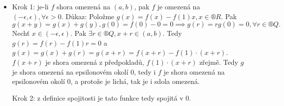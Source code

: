 \documentclass[12pt]{article}					%
\begin{document}
\begin{veta}
\begin{dukazin}
\begin{itemize}
                \item Krok 1: je-li $f$ shora omezená na $(a, b)$, pak $f$ je omezená na $(-\epsilon, \epsilon), \forall \epsilon > 0$. Důkaz: Položme $g(x) = f(x) - f(1)x, x \in ®R$. Pak
                    $$ g(x+y) = g(x)+g(y), g(0) = f(0) - 0 = 0 \implies g(r) = rg(0) = 0, \forall r \in ®Q. $$
                    Nechť $x \in (-\epsilon, \epsilon)$. Pak $\exists r \in ®Q, x+r \in (a, b)$. Tedy $g(r) = f(r) - f(1)r = 0$ a $g(x) = g(x) + g(r) = g(x+r) = f(x+r) - f(1)·(x+r)$. $f(x+r)$ je shora omezená z předpokladů, $f(1)·(x+r)$ zřejmě. Tedy $g$ je shora omezená na epsilonovém okolí 0, tedy i $f$ je shora omezená na epsilonovém okolí 0, a protože je lichá, tak je i sdola omezená.

                    Krok 2: z definice spojitosti je tato funkce tedy spojitá v 0.
            \end{itemize}
        \end{dukazin}
    \end{veta}
\end{document}
